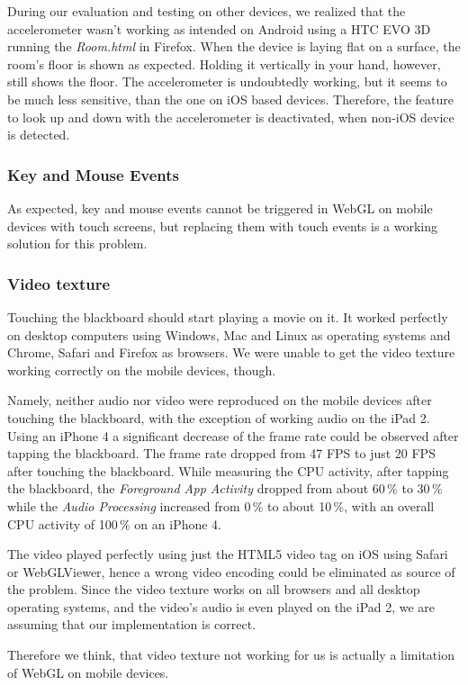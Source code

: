 \documentclass[12pt,journal,compsoc]{IEEEtran}
\begin{document}
During our evaluation and testing on other devices, we realized that the accelerometer wasn’t working as intended on Android using a HTC EVO 3D running the \textit{Room.html} in Firefox. When the device is laying flat on a surface, the room’s floor is shown as expected. Holding it vertically in your hand, however, still shows the floor. The accelerometer is undoubtedly working, but it seems to be much less sensitive, than the one on iOS based devices. Therefore, the feature to look up and down with the accelerometer is deactivated, when non-iOS device is detected.

\subsubsection{Key and Mouse Events}
As expected, key and mouse events cannot be triggered in WebGL on mobile devices with touch screens, but replacing them with touch events is a working solution for this problem.

\subsubsection{Video texture}
Touching the blackboard should start playing a movie on it. It worked perfectly on desktop computers using Windows, Mac and Linux as operating systems and Chrome, Safari and Firefox as browsers. We were unable to get the video texture working correctly on the mobile devices, though.

Namely, neither audio nor video were reproduced on the mobile devices after touching the blackboard, with the exception of working audio on the iPad 2. Using an iPhone 4 a significant decrease of the frame rate could be observed after tapping the blackboard. The frame rate dropped from 47 FPS to just 20 FPS after touching the blackboard. While measuring the CPU activity, after tapping the blackboard, the \textit{Foreground App Activity} dropped from about 60\,\% to 30\,\% while the \textit{Audio Processing} increased from 0\,\% to about 10\,\%, with an overall CPU activity of 100\,\% on an iPhone 4.

The video played perfectly using just the HTML5 video tag on iOS using Safari or WebGLViewer, hence a wrong video encoding could be eliminated as source of the problem. Since the video texture works on all browsers and all desktop operating systems, and the video’s audio is even played on the iPad 2, we are assuming that our implementation is correct. 

Therefore we think, that video texture not working for us is actually a limitation of WebGL on mobile devices.
\end{document}
